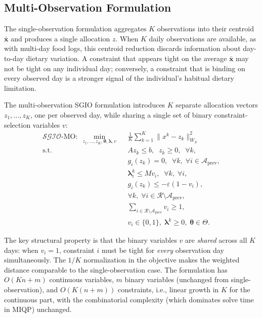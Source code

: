 \documentclass[journal]{IEEEtran}
\newcommand{\SGIO}{\mathcal{SGIO}}
\newcommand{\btheta}{\boldsymbol{\theta}}
\newcommand{\blambda}{\boldsymbol{\lambda}}
\newcommand{\bW}{W_S}
\newcommand{\xbar}{\bar{\mathbf{x}}}
\newcommand{\cR}{\mathcal{R}}
\newcommand{\cA}{\mathcal{A}}
\begin{document}
\subsection{Multi-Observation Formulation}
\label{subsec:multi_obs}

The single-observation formulation aggregates $K$ observations into their
centroid $\xbar$ and produces a single allocation $z$. When $K$ daily
observations are available, as with multi-day food logs, this centroid
reduction discards information about day-to-day dietary variation. A
constraint that appears tight on the average $\xbar$ may not be tight on
any individual day; conversely, a constraint that is binding on every
observed day is a stronger signal of the individual's habitual dietary
limitation.

The multi-observation SGIO formulation introduces $K$ separate allocation
vectors $z_1, \ldots, z_K$, one per observed day, while sharing a single
set of binary constraint-selection variables $v$:
\begin{subequations}\label{eq:SMGIL-multi}
\begin{align}
\SGIO\text{-MO}:\;\min_{z_1,\ldots,z_K,\btheta,\blambda,v}\;\;
& \frac{1}{K}\sum_{k=1}^K \| x^k - z_k \|_{\bW}^2
\label{eq:multi-obj}\\
\text{s.t.}\;\;
& A z_k \leq b,\;\; z_k \geq 0,\;\; \forall k,
\label{eq:multi-feas}\\
& g_i(z_k) = 0,\;\; \forall k,\;\forall i \in \cA_{\mathrm{prev}},
\label{eq:multi-inherit}\\
& \blambda^k_i \leq M v_i,\;\; \forall k,\;\forall i,
\label{eq:multi-comp}\\
& g_i(z_k) \leq -\varepsilon(1-v_i),\;\;\\ &
  \forall k,\;\forall i \in \cR\setminus\cA_{\mathrm{prev}},
\label{eq:multi-slack}\\
& \sum_{i \in \cR\setminus\cA_{\mathrm{prev}}} v_i \geq 1,
\label{eq:multi-increment}\\
& v_i \in \{0,1\},\;\blambda^k \geq 0,\;\btheta \in \Theta.
\label{eq:multi-domain}
\end{align}
\end{subequations}

The key structural property is that the binary variables $v$ are
\emph{shared} across all $K$ days: when $v_i = 1$, constraint $i$ must
be tight for \emph{every} observation day simultaneously. The $1/K$
normalization in the objective makes the weighted distance comparable to
the single-observation case. The formulation has $O(Kn + m)$ continuous
variables, $m$ binary variables (unchanged from single-observation), and
$O(K(n + m))$ constraints, i.e., linear growth in $K$ for the continuous
part, with the combinatorial complexity (which dominates solve time in
MIQP) unchanged.
\end{document}
